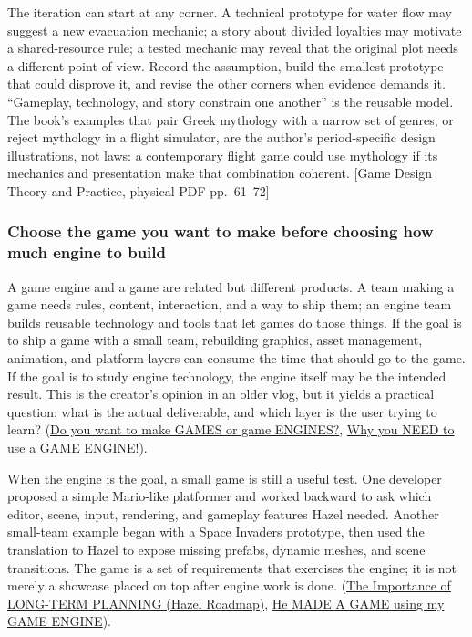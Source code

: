 The iteration can start at any corner. A technical prototype for water flow may suggest a new evacuation mechanic; a story about divided loyalties may motivate a shared-resource rule; a tested mechanic may reveal that the original plot needs a different point of view. Record the assumption, build the smallest prototype that could disprove it, and revise the other corners when evidence demands it. ``Gameplay, technology, and story constrain one another'' is the reusable model. The book's examples that pair Greek mythology with a narrow set of genres, or reject mythology in a flight simulator, are the author's period-specific design illustrations, not laws: a contemporary flight game could use mythology if its mechanics and presentation make that combination coherent. {[}Game Design Theory and Practice, physical PDF pp.~61--72{]}

\subsubsection{Choose the game you want to make before choosing how much engine to build}\label{05-engine-i-ch009-choose-the-game-you-want-to-make-before-choosing-how-much-engine-to-build}

\hypertarget{05-engine-i-ch009-choose-the-game-you-want-to-make-before-choosing-how-much-engine-to-build}{}

A game engine and a game are related but different products. A team making a game needs rules, content, interaction, and a way to ship them; an engine team builds reusable technology and tools that let games do those things. If the goal is to ship a game with a small team, rebuilding graphics, asset management, animation, and platform layers can consume the time that should go to the game. If the goal is to study engine technology, the engine itself may be the intended result. This is the creator's opinion in an older vlog, but it yields a practical question: what is the actual deliverable, and which layer is the user trying to learn? (\href{https://www.youtube.com/watch?v=Y4J4ZdQGEgo&t=0m20s}{Do you want to make GAMES or game ENGINES?}, \href{https://www.youtube.com/watch?v=QQ9MTzrsldo&t=0m1s}{Why you NEED to use a GAME ENGINE!}).

When the engine is the goal, a small game is still a useful test. One developer proposed a simple Mario-like platformer and worked backward to ask which editor, scene, input, rendering, and gameplay features Hazel needed. Another small-team example began with a Space Invaders prototype, then used the translation to Hazel to expose missing prefabs, dynamic meshes, and scene transitions. The game is a set of requirements that exercises the engine; it is not merely a showcase placed on top after engine work is done. (\href{https://www.youtube.com/watch?v=OsnwKYxPX1A&t=5m29s}{The Importance of LONG-TERM PLANNING (Hazel Roadmap)}, \href{https://www.youtube.com/watch?v=56ISmbJE9S4&t=2m10s}{He MADE A GAME using my GAME ENGINE}).

